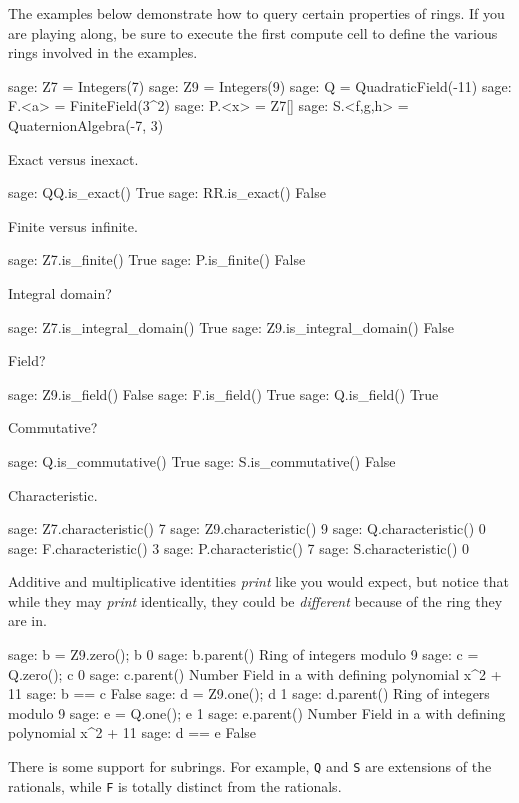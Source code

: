 %
%
The examples below demonstrate how to query certain properties of rings.  If you are playing along, be sure to execute the first compute cell to define the various rings involved in the examples.
%
\begin{sageexample}
sage: Z7 = Integers(7)
sage: Z9 = Integers(9)
sage: Q = QuadraticField(-11)
sage: F.<a> = FiniteField(3^2)
sage: P.<x> = Z7[]
sage: S.<f,g,h> = QuaternionAlgebra(-7, 3)
\end{sageexample}
%
Exact versus inexact.
%
\begin{sageexample}
sage: QQ.is_exact()
True
sage: RR.is_exact()
False
\end{sageexample}
%
Finite versus infinite.
%
\begin{sageexample}
sage: Z7.is_finite()
True
sage: P.is_finite()
False
\end{sageexample}
%
Integral domain?
%
\begin{sageexample}
sage: Z7.is_integral_domain()
True
sage: Z9.is_integral_domain()
False
\end{sageexample}
%
Field?
%
\begin{sageexample}
sage: Z9.is_field()
False
sage: F.is_field()
True
sage: Q.is_field()
True
\end{sageexample}
%
Commutative?
%
\begin{sageexample}
sage: Q.is_commutative()
True
sage: S.is_commutative()
False
\end{sageexample}
%
Characteristic.
%
\begin{sageexample}
sage: Z7.characteristic()
7
sage: Z9.characteristic()
9
sage: Q.characteristic()
0
sage: F.characteristic()
3
sage: P.characteristic()
7
sage: S.characteristic()
0
\end{sageexample}
%
Additive and multiplicative identities \emph{print} like you would expect, but notice that while they may \emph{print} identically, they could be \emph{different} because of the ring they are in.
%
\begin{sageexample}
sage: b = Z9.zero(); b
0
sage: b.parent()
Ring of integers modulo 9
sage: c = Q.zero(); c
0
sage: c.parent()
Number Field in a with defining polynomial x^2 + 11
sage: b == c
False
sage: d = Z9.one(); d
1
sage: d.parent()
Ring of integers modulo 9
sage: e = Q.one(); e
1
sage: e.parent()
Number Field in a with defining polynomial x^2 + 11
sage: d == e
False
\end{sageexample}
%
There is some support for subrings.  For example, \verb?Q? and \verb?S? are extensions of the rationals, while \verb?F? is totally distinct from the rationals.
